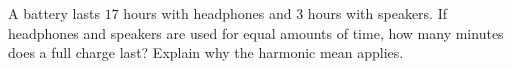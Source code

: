 A battery lasts $17$ hours with headphones and $3$ hours with speakers. If headphones and speakers are used for equal amounts of time, how many minutes does a full charge last? Explain why the harmonic mean applies.
